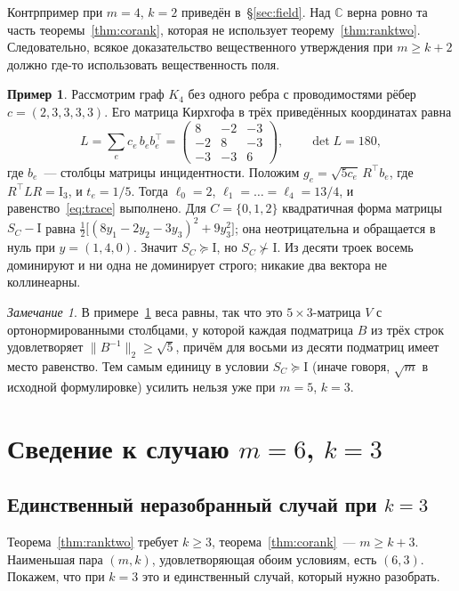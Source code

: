 \documentclass[11pt,a4paper]{article}
\theoremstyle{plain}
\theoremstyle{definition}
\newtheorem{example}[theorem]{Пример}
\theoremstyle{remark}
\newtheorem{remark}[theorem]{Замечание}
\newcommand{\CC}{\mathbb{C}}
\newcommand{\Id}{\mathrm{I}}
\newcommand{\T}{^{\!\top}}
\begin{document}
Контрпример при $m=4$, $k=2$ приведён в~\S\ref{sec:field}. Над $\CC$ верна
ровно та часть теоремы~\ref{thm:corank}, которая не использует
теорему~\ref{thm:ranktwo}. Следовательно, всякое доказательство вещественного
утверждения при $m\ge k+2$ должно где-то использовать вещественность поля.

\begin{example}\label{ex:diamond}
Рассмотрим граф $K_4$ без одного ребра с проводимостями рёбер
$c=(2,3,3,3,3)$. Его матрица Кирхгофа в трёх приведённых координатах равна
\[
  L=\sum_{e}c_e\,b_eb_e\T=\begin{pmatrix}8&-2&-3\\-2&8&-3\\-3&-3&6\end{pmatrix},
  \qquad\det L=180,
\]
где $b_e$~--- столбцы матрицы инцидентности. Положим $g_e=\sqrt{5c_e}\,R\T b_e$,
где $R\T LR=\Id_3$, и $t_e=1/5$. Тогда $\ell_0=2$, $\ell_1=\dots=\ell_4=13/4$,
и равенство~\eqref{eq:trace} выполнено. Для $C=\{0,1,2\}$ квадратичная форма
матрицы $S_C-\Id$ равна $\tfrac12\bigl[(8y_1-2y_2-3y_3)^2+9y_3^2\bigr]$; она
неотрицательна и обращается в нуль при $y=(1,4,0)$. Значит $S_C\succeq\Id$,
но $S_C\not\succ\Id$. Из десяти троек восемь доминируют и ни одна не
доминирует строго; никакие два вектора не коллинеарны.
\end{example}

\begin{remark}
В примере~\ref{ex:diamond} веса равны, так что это $5\times3$-матрица $V$ с
ортонормированными столбцами, у которой каждая подматрица $B$ из трёх строк
удовлетворяет $\|B^{-1}\|_2\ge\sqrt5$, причём для восьми из десяти
подматриц имеет место равенство. Тем самым единицу в условии $S_C\succeq\Id$
(иначе говоря, $\sqrt m$ в исходной формулировке) усилить нельзя уже при
$m=5$, $k=3$.
\end{remark}

\section{Сведение к случаю $m=6$, $k=3$}

\subsection{Единственный неразобранный случай при $k=3$}

Теорема~\ref{thm:ranktwo} требует $k\ge3$, теорема~\ref{thm:corank}~---
$m\ge k+3$. Наименьшая пара $(m,k)$, удовлетворяющая обоим условиям, есть
$(6,3)$. Покажем, что при $k=3$ это и единственный случай, который нужно
разобрать.
\end{document}
